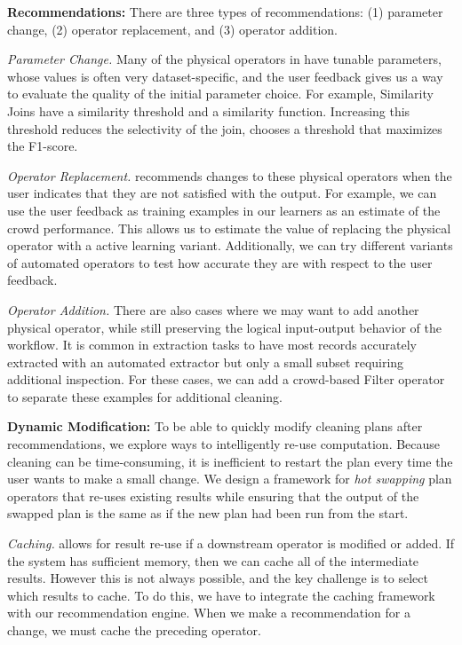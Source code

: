 \vspace{.25em}

{\noindent \bf Recommendations:} There are three types of recommendations: (1) parameter change, (2) operator replacement, and (3) operator addition.

\textit{Parameter Change.} Many of the physical operators in \sys have tunable parameters, whose values is often very dataset-specific, and the user feedback gives us a way to evaluate the quality of the initial parameter choice. 
For example, Similarity Joins have a similarity threshold and a similarity function. 
Increasing this threshold reduces the selectivity of the join, \sys chooses a threshold that maximizes the F1-score. 

\textit{Operator Replacement.} 
\sys recommends changes to these physical operators when the user indicates that they are not satisfied with the output.
For example, we can use the user feedback as training examples in our learners as an estimate of the crowd performance.
This allows us to estimate the value of replacing the physical operator with a active learning variant.
Additionally, we can try different variants of automated operators to test how accurate they are with respect to the user feedback.

\textit{Operator Addition.}  There are also cases where we may want to add another physical operator, while still preserving the logical input-output behavior of the workflow.
It is common in extraction tasks to have most records accurately extracted with an automated extractor but only a small subset requiring additional inspection. 
For these cases, we can add a crowd-based Filter operator to separate these examples for additional cleaning.

\vspace{.5em}

{\noindent \bf Dynamic Modification:} To be able to quickly modify cleaning plans after recommendations, we explore ways to intelligently re-use computation. Because cleaning can be time-consuming, it is inefficient to 
restart the plan every time the user wants to make a small change.
We design a framework for \emph{hot swapping} plan operators that re-uses existing results while ensuring that the output of the swapped plan is the same as if the new plan had been run from the start.

\textit{Caching.} allows for result re-use if a downstream operator is modified or added.
If the system has sufficient memory, then we can cache all of the intermediate results. 
However this is not always possible, and the key challenge is to select which results to cache.
To do this, we have to integrate the caching framework with our recommendation engine.
When we make a recommendation for a change, we must cache the preceding operator. 

